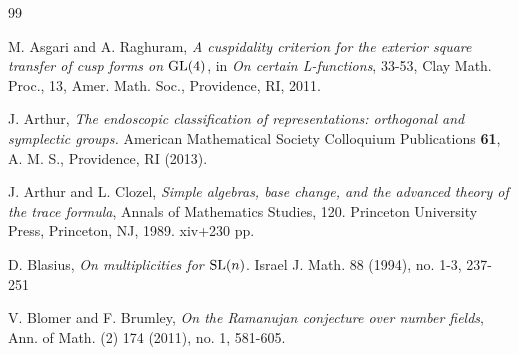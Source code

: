 \documentclass[11pt]{amsart}
\theoremstyle{plain}
\numberwithin{equation}{section}
\def\SL{{\rm SL}}
\def\GL{{\rm GL}}
\begin{document}

\vskip 10pt

\begin{thebibliography}{99}

 M. Asgari and A. Raghuram, {\em A cuspidality criterion for the exterior square transfer of cusp forms on $\GL(4)$},  in {\em On certain L-functions}, 33-53, Clay Math. Proc., 13, Amer. Math. Soc., Providence, RI, 2011. 

 
 J. Arthur,
\emph{The endoscopic classification of representations: orthogonal and symplectic groups.}
American Mathematical Society Colloquium Publications \textbf{61},
A. M. S., Providence, RI (2013).

 J. Arthur and L. Clozel, {\em Simple algebras, base change, and the advanced theory of the trace formula},
Annals of Mathematics Studies, 120. Princeton University Press, Princeton, NJ, 1989. xiv+230 pp.




 D. Blasius, {\em On multiplicities for $\SL(n)$}. Israel J. Math. 88 (1994), no. 1-3, 237-251

 V.  Blomer and F. Brumley, {\em On the Ramanujan conjecture over number fields}, Ann. of Math. (2) 174 (2011), no. 1, 581-605.



\end{thebibliography}
\end{document}
